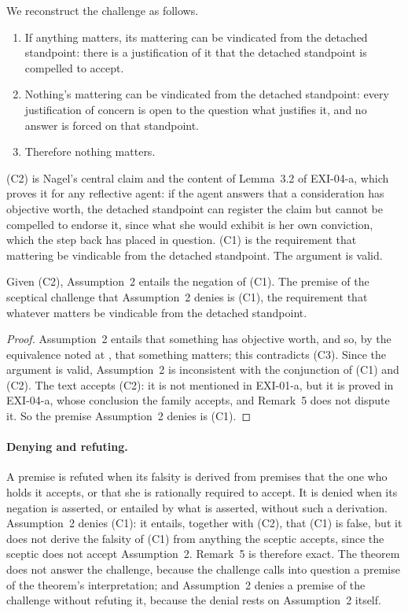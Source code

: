We reconstruct the challenge as follows.

\begin{enumerate}[label=(C\arabic*)]
\item If anything matters, its mattering can be vindicated from the detached standpoint: there is a justification of it that the detached standpoint is compelled to accept.
\item Nothing's mattering can be vindicated from the detached standpoint: every justification of concern is open to the question what justifies it, and no answer is forced on that standpoint.
\item Therefore nothing matters.
\end{enumerate}

(C2) is Nagel's central claim and the content of Lemma~3.2 of EXI-04-a, which proves it for any reflective agent: if the agent answers that a consideration has objective worth, the detached standpoint can register the claim but cannot be compelled to endorse it, since what she would exhibit is her own conviction, which the step back has placed in question. (C1) is the requirement that mattering be vindicable from the detached standpoint. The argument is valid.

\begin{proposition}\label{p:vind}
Given (C2), Assumption~2 entails the negation of (C1). The premise of the sceptical challenge that Assumption~2 denies is (C1), the requirement that whatever matters be vindicable from the detached standpoint.
\end{proposition}

\begin{proof}
Assumption~2 entails that something has objective worth, and so, by the equivalence noted at , that something matters; this contradicts (C3). Since the argument is valid, Assumption~2 is inconsistent with the conjunction of (C1) and (C2). The text accepts (C2): it is not mentioned in EXI-01-a, but it is proved in EXI-04-a, whose conclusion the family accepts, and Remark~5 does not dispute it. So the premise Assumption~2 denies is (C1).
\end{proof}

\paragraph{Denying and refuting.} A premise is refuted when its falsity is derived from premises that the one who holds it accepts, or that she is rationally required to accept. It is denied when its negation is asserted, or entailed by what is asserted, without such a derivation. Assumption~2 denies (C1): it entails, together with (C2), that (C1) is false, but it does not derive the falsity of (C1) from anything the sceptic accepts, since the sceptic does not accept Assumption~2. Remark~5 is therefore exact. The theorem does not answer the challenge, because the challenge calls into question a premise of the theorem's interpretation; and Assumption~2 denies a premise of the challenge without refuting it, because the denial rests on Assumption~2 itself.


